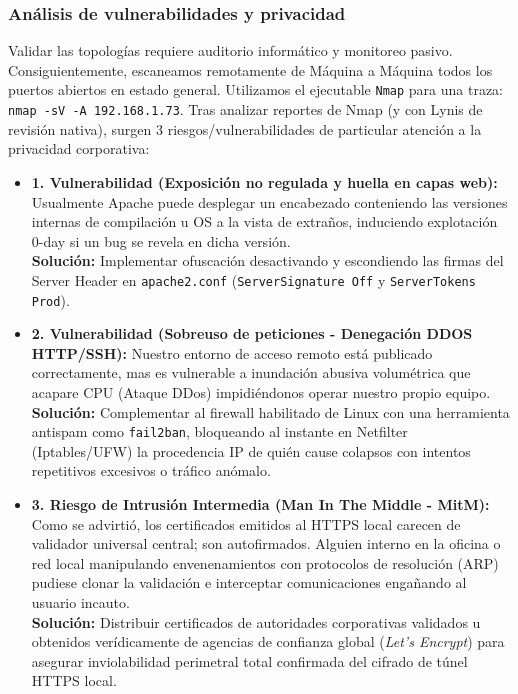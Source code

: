 \documentclass[stu, 12pt, letterpaper, donotrepeattitle, floatsintext, noapacite]{apa7}
\begin{document}
\subsubsection{Análisis de vulnerabilidades y privacidad}
Validar las topologías requiere auditorio informático y monitoreo pasivo. Consiguientemente, escaneamos remotamente de Máquina a Máquina todos los puertos abiertos en estado general. Utilizamos el ejecutable \texttt{Nmap} para una traza: \texttt{nmap -sV -A 192.168.1.73}. Tras analizar reportes de Nmap (y con Lynis de revisión nativa), surgen 3 riesgos/vulnerabilidades de particular atención a la privacidad corporativa:

\begin{itemize}
    \item \textbf{1. Vulnerabilidad (Exposición no regulada y huella en capas web):} Usualmente Apache puede desplegar un encabezado conteniendo las versiones internas de compilación u OS a la vista de extraños, induciendo explotación 0-day si un bug se revela en dicha versión. \\ \textbf{Solución:} Implementar ofuscación desactivando y escondiendo las firmas del Server Header en \texttt{apache2.conf} (\texttt{ServerSignature Off} y \texttt{ServerTokens Prod}).
    \item \textbf{2. Vulnerabilidad (Sobreuso de peticiones - Denegación DDOS HTTP/SSH):} Nuestro entorno de acceso remoto está publicado correctamente, mas es vulnerable a inundación abusiva volumétrica que acapare CPU (Ataque DDos) impidiéndonos operar nuestro propio equipo. \\ \textbf{Solución:} Complementar al firewall habilitado de Linux con una herramienta antispam como \texttt{fail2ban}, bloqueando al instante en Netfilter (Iptables/UFW) la procedencia IP de quién cause colapsos con intentos repetitivos excesivos o tráfico anómalo.
    \item \textbf{3. Riesgo de Intrusión Intermedia (Man In The Middle - MitM):} Como se advirtió, los certificados emitidos al HTTPS local carecen de validador universal central; son autofirmados. Alguien interno en la oficina o red local manipulando envenenamientos con protocolos de resolución (ARP) pudiese clonar la validación e interceptar comunicaciones engañando al usuario incauto. \\ \textbf{Solución:} Distribuir certificados de autoridades corporativas validados u obtenidos verídicamente de agencias de confianza global (\textit{Let's Encrypt}) para asegurar inviolabilidad perimetral total confirmada del cifrado de túnel HTTPS local.
\end{itemize}
\end{document}
